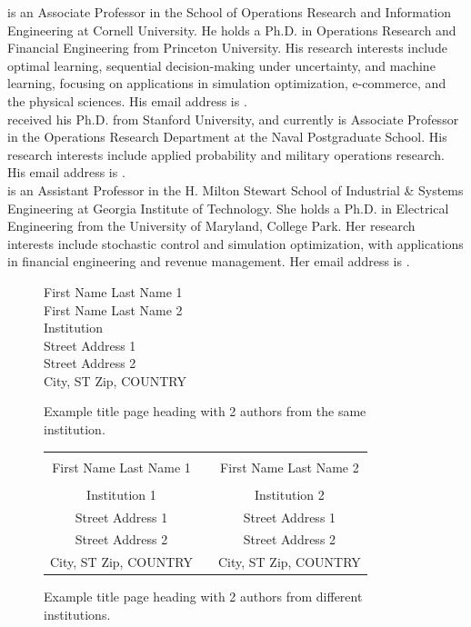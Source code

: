 \documentclass{wscpaperproc}
\theoremstyle{wsc}
\begin{document}
 is an Associate Professor in the School of Operations Research and Information Engineering at Cornell University. He holds a Ph.D. in Operations Research and Financial Engineering from Princeton University. His research interests include optimal learning, sequential decision-making under uncertainty, and machine learning, focusing on applications in simulation optimization, e-commerce, and the physical sciences.  His email address is . \\

 received his Ph.D. from Stanford University, and currently is Associate Professor in the Operations Research Department at the Naval Postgraduate School. His research interests include applied probability and military operations research. His email address is .\\

 is an Assistant Professor in the H. Milton Stewart School of Industrial \& Systems Engineering at Georgia Institute of Technology. She holds a Ph.D. in Electrical Engineering from the University of Maryland, College Park. Her research interests include stochastic control and simulation optimization, with applications in financial engineering and revenue management. Her email address is .\\


\newpage

\begin{figure}[htb]
{
\centering
First Name Last Name 1 \\
First Name Last Name 2 \\
\vspace{12pt}
Institution \\
Street Address 1 \\
Street Address 2 \\
City, ST Zip, COUNTRY
\caption{Example title page heading with 2 authors from the same institution.\label{fig: 2 same}}
}
\end{figure}

\begin{figure}[htb]
{
\centering
\begin{tabular}{ccc}
\phantom{Entries to adjust spacing - ignore} & \phantom{intermediate space} & \phantom{Entries to adjust spacing - ignore} \\
First Name Last Name 1 & & First Name Last Name 2 \\
\\
Institution 1 & & Institution 2 \\
Street Address 1 & & Street Address 1 \\
Street Address 2 & & Street Address 2 \\
City, ST Zip, COUNTRY & & City, ST Zip, COUNTRY
\end{tabular}
\caption{Example title page heading with 2 authors from different institutions.\label{fig: 2 different}}
}
\end{figure}
\end{document}
